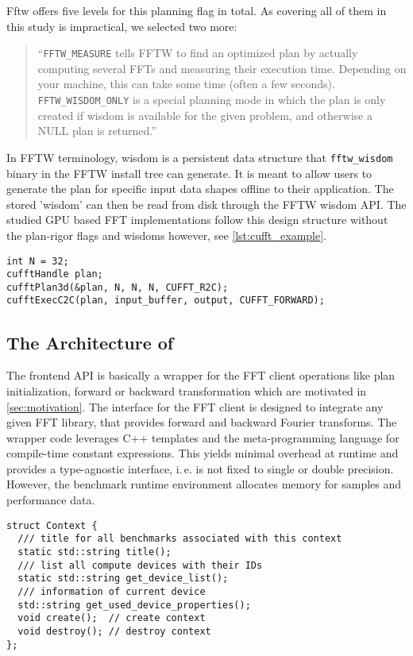 %
Fftw offers five levels for this planning flag in total. As covering all of them in this study is impractical, we selected two more:
\begin{quote}
``\texttt{FFTW\_MEASURE} tells FFTW to find an optimized plan by actually computing several FFTs and measuring their execution time. Depending on your machine, this can take some time (often a few seconds).\newline
\texttt{FFTW\_WISDOM\_ONLY} is a special planning mode in which the plan is only created if wisdom is available for the given problem, and otherwise a NULL plan is returned.''
\end{quote}
%
In FFTW terminology, wisdom is a persistent data structure that \texttt{fftw\_wisdom} binary in the FFTW install tree can generate. It is meant to allow users to generate the plan for specific input data shapes offline to their application. The stored 'wisdom' can then be read from disk through the FFTW wisdom API.
The studied GPU based FFT implementations follow this design structure without the plan-rigor flags and wisdoms however, see \cref{lst:cufft_example}.
\begin{lstlisting}[caption={Minimal usage example of the cuFFT single precision real-to-complex planner API. Memory management is omitted.},label={lst:cufft_example}]
int N = 32;
cufftHandle plan;
cufftPlan3d(&plan, N, N, N, CUFFT_R2C);
cufftExecC2C(plan, input_buffer, output, CUFFT_FORWARD);
\end{lstlisting}
%
\subsection{The Architecture of \gearshifft{}}
\label{ssec:gearshifft_arch}

The frontend API is basically a wrapper for the FFT client operations like plan initialization, forward or backward transformation which are motivated in \cref{sec:motivation}.
The interface for the FFT client is designed to integrate any given FFT library, that provides forward and backward Fourier transforms.
The wrapper code leverages C++ templates and the meta-programming language for compile-time constant expressions.
This yields minimal overhead at runtime and provides a type-agnostic interface, i.\,e. \gearshifft{} is not fixed to single or double precision.
However, the benchmark runtime environment allocates memory for samples and performance data.

\begin{lstlisting}[caption={Context class required by gearshifft frontend API},label={lst:implcontext}]
struct Context {
  /// title for all benchmarks associated with this context
  static std::string title();
  /// list all compute devices with their IDs
  static std::string get_device_list();
  /// information of current device
  std::string get_used_device_properties();
  void create();  // create context
  void destroy(); // destroy context
};
\end{lstlisting}

